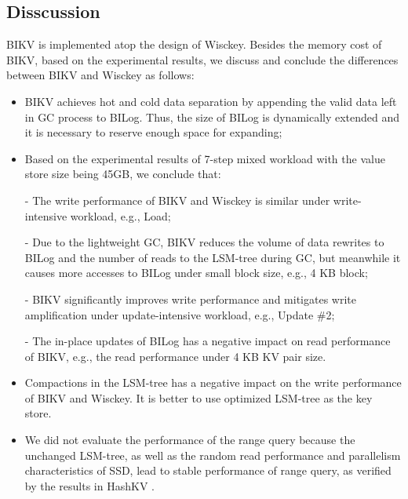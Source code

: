 \documentclass[sigconf]{acmart}
\begin{document}
\subsection{Disscussion}
BIKV is implemented atop the design of Wisckey. Besides the memory cost of BIKV, based on the experimental results, we discuss and conclude the differences between BIKV and Wisckey as follows:
\begin{itemize}
	\item BIKV achieves hot and cold data separation by appending the valid data left in GC process to BILog. Thus, the size of BILog is dynamically extended and it is necessary to reserve enough space for expanding;
	\item Based on the experimental results of 7-step mixed workload with the value store size being 45GB, we conclude that:
		\item[-] The write performance of BIKV and Wisckey is similar under write-intensive workload, e.g., Load;
		\item[-] Due to the lightweight GC, BIKV reduces the volume of data rewrites to BILog and the number of reads to the LSM-tree during GC, but meanwhile it causes more accesses to BILog under small block size, e.g., 4 KB block;
		\item[-] BIKV significantly improves write performance and mitigates write amplification under update-intensive workload, e.g., Update \#2;
		\item[-] The in-place updates of BILog has a negative impact on read performance of BIKV, e.g., the read performance under 4 KB KV pair size.
	\item Compactions in the LSM-tree has a negative impact on the write performance of BIKV and Wisckey. It is better to use optimized LSM-tree as the key store.
	\item We did not evaluate the performance of the range query because the unchanged LSM-tree, as well as the random read performance and parallelism characteristics of SSD, lead to stable performance of range query, as verified by the results in HashKV \cite{HashKV}.
\end{itemize}
\end{document}
